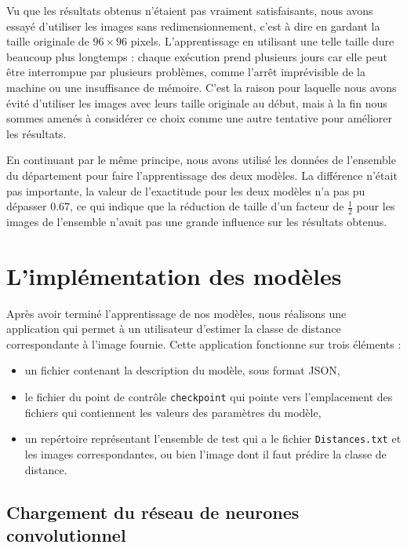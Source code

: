 Vu que les résultats obtenus n'étaient pas vraiment satisfaisants, nous avons essayé
d'utiliser les images sans redimensionnement, c'est à dire en gardant la taille
originale de $96 \times 96$ pixels. L'apprentissage en utilisant une telle taille
dure beaucoup plus longtemps : chaque exécution prend plusieurs jours car elle peut être
interrompue par plusieurs problèmes, comme l'arrêt imprévisible de la machine ou
une insuffisance de mémoire. C'est la raison pour laquelle nous avons évité
d'utiliser les images avec leurs taille originale au début, mais à la fin nous
sommes amenés à considérer ce choix comme une autre tentative pour améliorer les résultats.

En continuant par le même principe, nous avons utilisé les données de l'ensemble
du département pour faire l'apprentissage des deux modèles. La différence n'était
pas importante, la valeur de l'exactitude pour les deux modèles n'a pas pu
dépasser $0.67$, ce qui indique que la réduction de taille d'un facteur de $\frac{1}{2}$
pour les images de l'ensemble n'avait pas une grande influence sur les résultats obtenus.

\section{L'implémentation des modèles}

Après avoir terminé l'apprentissage de nos modèles, nous réalisons une
application qui permet à un utilisateur d'estimer la classe de distance correspondante
à l'image fournie. Cette application fonctionne sur trois éléments :

\begin{itemize}
  \item un fichier contenant la description du modèle, sous format JSON,
  \item le fichier du point de contrôle \texttt{checkpoint} qui pointe vers
  l'emplacement des fichiers qui contiennent les valeurs des paramètres du modèle,
  \item un repértoire représentant l'ensemble de test qui a le fichier \texttt{Distances.txt}
  et les images correspondantes, ou bien l'image dont il faut prédire la classe de distance.
\end{itemize}

\subsection{Chargement du réseau de neurones convolutionnel}

